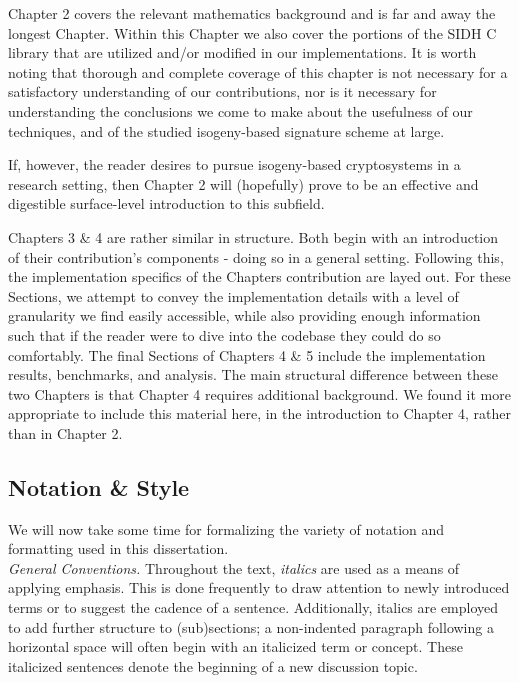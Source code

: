 Chapter 2 covers the relevant mathematics background and is far and away the longest Chapter. Within this Chapter we also cover the portions of the SIDH C library that are utilized and/or modified in our implementations. It is worth noting that thorough and complete coverage of this chapter is not necessary for a satisfactory understanding of our contributions, nor is it necessary for understanding the conclusions we come to make about the usefulness of our techniques, and of the studied isogeny-based signature scheme at large.

If, however, the reader desires to pursue isogeny-based cryptosystems in a research setting, then Chapter 2 will (hopefully) prove to be an effective and digestible surface-level introduction to this subfield.  

Chapters 3 \& 4 are rather similar in structure. Both begin with an introduction of their contribution's components - doing so in a general setting. Following this, the implementation specifics of the Chapters contribution are layed out. For these Sections, we attempt to convey the implementation details with a level of granularity we find easily accessible, while also providing enough information such that if the reader were to dive into the codebase they could do so comfortably. The final Sections of Chapters 4 \& 5 include the implementation results, benchmarks, and analysis. The main structural difference between these two Chapters is that Chapter 4 requires additional background. We found it more appropriate to include this material here, in the introduction to Chapter 4, rather than in Chapter 2.

\subsection{Notation \& Style}

We will now take some time for formalizing the variety of notation and formatting  used in this dissertation.\\

\noindent
\textit{General Conventions.} Throughout the text, \textit{italics} are used as a means of applying emphasis. This is done frequently to draw attention to newly introduced terms or to suggest the cadence of a sentence. Additionally, italics are employed to add further structure to (sub)sections; a non-indented paragraph following a horizontal space will often begin with an italicized term or concept. These italicized sentences denote the beginning of a new discussion topic.\\

